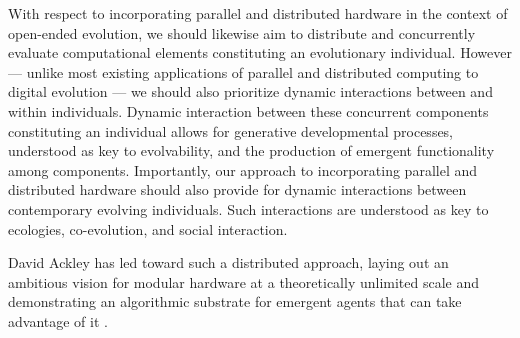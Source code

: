 With respect to incorporating parallel and distributed hardware in the context of open-ended evolution, we should likewise aim to distribute and concurrently evaluate computational elements constituting an evolutionary individual.
However --- unlike most existing applications of parallel and distributed computing to digital evolution --- we should also prioritize dynamic interactions between and within individuals.
Dynamic interaction between these concurrent components constituting an individual allows for generative developmental processes, understood as key to evolvability, and the production of emergent functionality among components.
Importantly, our approach to incorporating parallel and distributed hardware should also provide for dynamic interactions between contemporary evolving individuals.
Such interactions are understood as key to ecologies, co-evolution, and social interaction. %

David Ackley has led toward such a distributed approach, laying out an ambitious vision for modular hardware at a theoretically unlimited scale \citep{ackley2011pursue} and demonstrating an algorithmic substrate for emergent agents that can take advantage of it \citep{ackley2018digital}.


